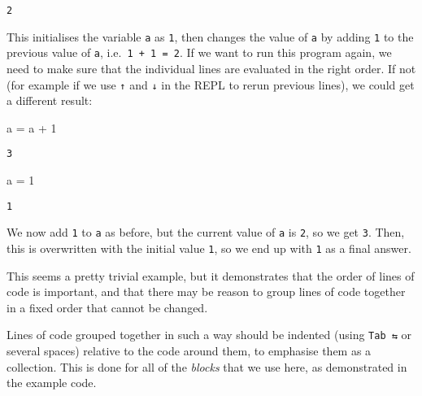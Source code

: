 \documentclass[
  letterpaper,
  DIV=11,
  numbers=noendperiod]{scrreprt}
\newenvironment{Shaded}{\begin{snugshade}}{\end{snugshade}}
\newcommand{\FloatTok}[1]{\textcolor[rgb]{0.68,0.00,0.00}{#1}}
\newcommand{\NormalTok}[1]{\textcolor[rgb]{0.00,0.23,0.31}{#1}}
\newcommand{\OperatorTok}[1]{\textcolor[rgb]{0.37,0.37,0.37}{#1}}
\begin{document}
\begin{verbatim}
2
\end{verbatim}

This initialises the variable \texttt{a} as \texttt{1}, then changes the
value of \texttt{a} by adding \texttt{1} to the previous value of
\texttt{a}, i.e.~\texttt{1\ +\ 1\ =\ 2}. If we want to run this program
again, we need to make sure that the individual lines are evaluated in
the right order. If not (for example if we use \texttt{↑} and \texttt{↓}
in the REPL to rerun previous lines), we could get a different result:

\begin{Shaded}
\begin{Highlighting}[]
\NormalTok{a }\OperatorTok{=}\NormalTok{ a }\OperatorTok{+} \FloatTok{1}
\end{Highlighting}
\end{Shaded}

\begin{verbatim}
3
\end{verbatim}

\begin{Shaded}
\begin{Highlighting}[]
\NormalTok{a }\OperatorTok{=} \FloatTok{1}
\end{Highlighting}
\end{Shaded}

\begin{verbatim}
1
\end{verbatim}

We now add \texttt{1} to \texttt{a} as before, but the current value of
\texttt{a} is \texttt{2}, so we get \texttt{3}. Then, this is
overwritten with the initial value \texttt{1}, so we end up with
\texttt{1} as a final answer.

This seems a pretty trivial example, but it demonstrates that the order
of lines of code is important, and that there may be reason to group
lines of code together in a fixed order that cannot be changed.

\begin{tcolorbox}[enhanced jigsaw, toprule=.15mm, opacitybacktitle=0.6, leftrule=.75mm, breakable, coltitle=black, bottomrule=.15mm, colbacktitle=quarto-callout-tip-color!10!white, bottomtitle=1mm, rightrule=.15mm, title=\textcolor{quarto-callout-tip-color}{\faLightbulb}\hspace{0.5em}{Convention}, colframe=quarto-callout-tip-color-frame, left=2mm, colback=white, opacityback=0, arc=.35mm, toptitle=1mm, titlerule=0mm]

Lines of code grouped together in such a way should be indented (using
\texttt{Tab\ ⇆} or several spaces) relative to the code around them, to
emphasise them as a collection. This is done for all of the
\emph{blocks} that we use here, as demonstrated in the example code.

\end{tcolorbox}
\end{document}
